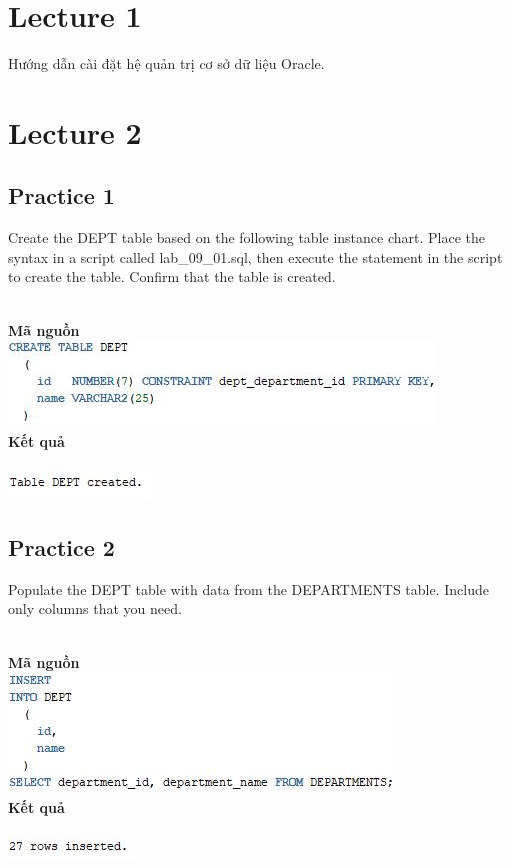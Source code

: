 \documentclass[12pt,a4paper]{report}
\begin{document}
\section{Lecture 1}
Hướng dẫn cài đặt hệ quản trị cơ sở dữ liệu Oracle.
\section{Lecture 2}
\subsection{Practice 1}
\begin{boxedminipage}[t]{15.5cm}
	Create the DEPT table based on the following table instance chart. Place the syntax in a script called lab\_09\_01.sql,
	then execute the statement in the script to create the table. Confirm that the table is created.
\end{boxedminipage}
\newline
\\
\textbf{Mã nguồn}
\\
\newline
\includegraphics[scale=1]{p1.jpg}\\
\textbf{Kết quả}\\\\
\includegraphics[scale=1]{kp1.jpg}

\subsection{Practice 2}
\begin{boxedminipage}[t]{15.5cm}
	Populate the DEPT table with data from the DEPARTMENTS table. Include only columns that you need.
\end{boxedminipage}
\newline
\\
\textbf{Mã nguồn}\\
\includegraphics[scale=1]{p2.jpg}\\
\textbf{Kết quả}\\\\
\includegraphics[scale=1]{kp2.jpg}
\end{document}

